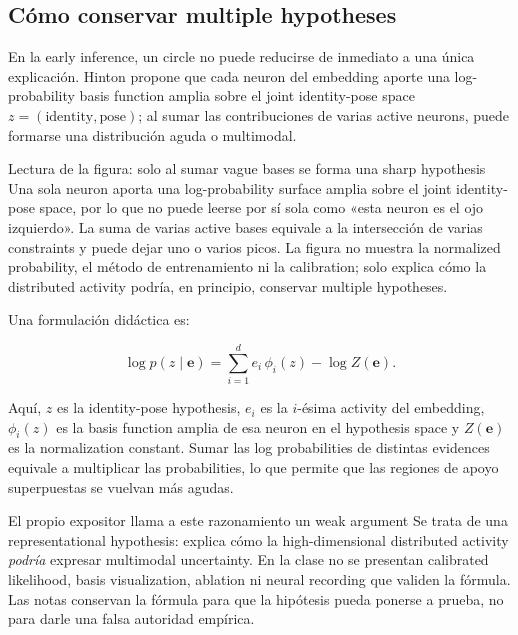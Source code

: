 \subsection{Cómo conservar multiple hypotheses}

En la early inference, un circle no puede reducirse de inmediato a una única explicación. Hinton propone que cada neuron del embedding aporte una log-probability basis function amplia sobre el joint identity-pose space $z=(\text{identity},\text{pose})$; al sumar las contribuciones de varias active neurons, puede formarse una distribución aguda o multimodal.


\begin{knowledgebox}{Lectura de la figura: solo al sumar vague bases se forma una sharp hypothesis}
Una sola neuron aporta una log-probability surface amplia sobre el joint identity-pose space, por lo que no puede leerse por sí sola como «esta neuron es el ojo izquierdo». La suma de varias active bases equivale a la intersección de varias constraints y puede dejar uno o varios picos. La figura no muestra la normalized probability, el método de entrenamiento ni la calibration; solo explica cómo la distributed activity podría, en principio, conservar multiple hypotheses.
\end{knowledgebox}

Una formulación didáctica es:

\[
\log p(z\mid\mathbf e)=\sum_{i=1}^{d} e_i\,\phi_i(z)-\log Z(\mathbf e).
\]

Aquí, $z$ es la identity-pose hypothesis, $e_i$ es la $i$-ésima activity del embedding, $\phi_i(z)$ es la basis function amplia de esa neuron en el hypothesis space y $Z(\mathbf e)$ es la normalization constant. Sumar las log probabilities de distintas evidences equivale a multiplicar las probabilities, lo que permite que las regiones de apoyo superpuestas se vuelvan más agudas.

\begin{warningbox}{El propio expositor llama a este razonamiento un weak argument}
Se trata de una representational hypothesis: explica cómo la high-dimensional distributed activity \emph{podría} expresar multimodal uncertainty. En la clase no se presentan calibrated likelihood, basis visualization, ablation ni neural recording que validen la fórmula. Las notas conservan la fórmula para que la hipótesis pueda ponerse a prueba, no para darle una falsa autoridad empírica.
\end{warningbox}

